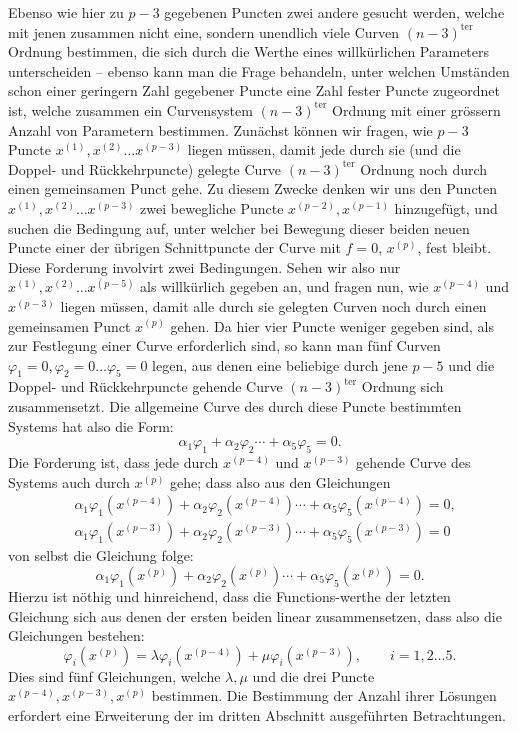 \documentclass[10pt]{article}
\begin{document}
Ebenso wie hier zu \(p-3\) gegebenen Puncten zwei andere gesucht werden, welche mit jenen zusammen nicht eine, sondern unendlich viele Curven \((n-3)^{\mathrm{ter}}\) Ordnung bestimmen, die sich durch die Werthe eines willkürlichen Parameters unterscheiden -- ebenso kann man die Frage behandeln, unter welchen Umständen schon einer geringern Zahl gegebener Puncte eine Zahl fester Puncte zugeordnet ist, welche zusammen ein Curvensystem \((n-3)^{\mathrm{ter}}\) Ordnung mit einer grössern Anzahl von Parametern bestimmen. Zunächst können wir fragen, wie \(p-3\) Puncte \(x^{(1)},x^{(2)}\ldots x^{(p-3)}\) liegen müssen, damit jede durch sie (und die Doppel- und Rückkehrpuncte) gelegte Curve \((n-3)^{\mathrm{ter}}\) Ordnung noch durch einen gemeinsamen Punct gehe. Zu diesem Zwecke denken wir uns den Puncten \(x^{(1)},x^{(2)}\ldots x^{(p-3)}\) zwei bewegliche Puncte \(x^{(p-2)},x^{(p-1)}\) hinzugefügt, und suchen die Bedingung auf, unter welcher bei Bewegung dieser beiden neuen Puncte einer der übrigen Schnittpuncte der Curve mit \(f=0\), \(x^{(p)}\), fest bleibt. Diese Forderung involvirt zwei Bedingungen. Sehen wir also nur \(x^{(1)},x^{(2)}\ldots x^{(p-5)}\) als willkürlich gegeben an, und fragen nun, wie \(x^{(p-4)}\) und \(x^{(p-3)}\) liegen müssen, damit alle durch sie gelegten Curven noch durch einen gemeinsamen Punct \(x^{(p)}\) gehen. Da hier vier Puncte weniger gegeben sind, als zur Festlegung einer Curve erforderlich sind, so kann man fünf Curven \(\varphi_1=0,\varphi_2=0\ldots\varphi_5=0\) legen, aus denen eine beliebige durch jene \(p-5\) und die Doppel- und Rückkehrpuncte gehende Curve \((n-3)^{\mathrm{ter}}\) Ordnung sich zusammensetzt. Die allgemeine Curve des durch diese Puncte bestimmten Systems hat also die Form:
\[
\alpha_1\varphi_1+\alpha_2\varphi_2\cdots+\alpha_5\varphi_5=0.
\]
Die Forderung ist, dass jede durch \(x^{(p-4)}\) und \(x^{(p-3)}\) gehende Curve des Systems auch durch \(x^{(p)}\) gehe; dass also aus den Gleichungen
\[
\begin{aligned}
&\alpha_1\varphi_1(x^{(p-4)})+\alpha_2\varphi_2(x^{(p-4)})\cdots+\alpha_5\varphi_5(x^{(p-4)})=0,\\
&\alpha_1\varphi_1(x^{(p-3)})+\alpha_2\varphi_2(x^{(p-3)})\cdots+\alpha_5\varphi_5(x^{(p-3)})=0
\end{aligned}
\]
von selbst die Gleichung folge:
\[
\alpha_1\varphi_1(x^{(p)})+\alpha_2\varphi_2(x^{(p)})\cdots+\alpha_5\varphi_5(x^{(p)})=0.
\]
Hierzu ist nöthig und hinreichend, dass die Functions-werthe der letzten Gleichung sich aus denen der ersten beiden linear zusammensetzen, dass also die Gleichungen bestehen:
\[
\varphi_i(x^{(p)})=\lambda\varphi_i(x^{(p-4)})+\mu\varphi_i(x^{(p-3)}),
\qquad i=1,2\ldots 5.
\]
Dies sind fünf Gleichungen, welche \(\lambda,\mu\) und die drei Puncte \(x^{(p-4)},x^{(p-3)},x^{(p)}\) bestimmen. Die Bestimmung der Anzahl ihrer Lösungen erfordert eine Erweiterung der im dritten Abschnitt ausgeführten Betrachtungen.
\end{document}
